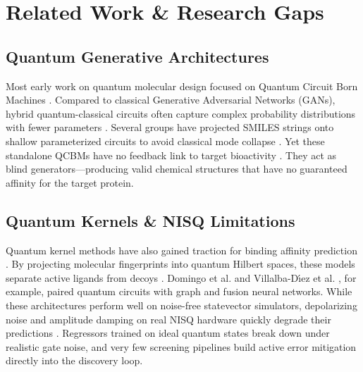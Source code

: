 \documentclass[journal,10pt,twocolumn]{IEEEtran}
\begin{document}
\section{Related Work \& Research Gaps}

\subsection{Quantum Generative Architectures}
Most early work on quantum molecular design focused on Quantum Circuit Born Machines \cite{du2020quantum}. Compared to classical Generative Adversarial Networks (GANs), hybrid quantum-classical circuits often capture complex probability distributions with fewer parameters \cite{zhou2026quantum, sewak2025quantum, sewak2025genai}. Several groups have projected SMILES strings onto shallow parameterized circuits to avoid classical mode collapse \cite{zhou2023implementation, zhou2026machine, future2025drug}. Yet these standalone QCBMs have no feedback link to target bioactivity \cite{quantum2026litreview, qml2026emerging}. They act as blind generators---producing valid chemical structures that have no guaranteed affinity for the target protein.

\subsection{Quantum Kernels \& NISQ Limitations}
Quantum kernel methods have also gained traction for binding affinity prediction \cite{pallavi2025qkdti, pallavi2025qkdti2}. By projecting molecular fingerprints into quantum Hilbert spaces, these models separate active ligands from decoys \cite{erol2025variational, erol2025varreg, yin2025benchmarking, yin2025vqe}. Domingo et al. \cite{domingo2023hybrid} and Villalba-D{\'\i}ez et al. \cite{villalba2025quantum}, for example, paired quantum circuits with graph and fusion neural networks. While these architectures perform well on noise-free statevector simulators, depolarizing noise and amplitude damping on real NISQ hardware quickly degrade their predictions \cite{saggi2024federated, bertl2024quantum}. Regressors trained on ideal quantum states break down under realistic gate noise, and very few screening pipelines build active error mitigation directly into the discovery loop.
\end{document}

